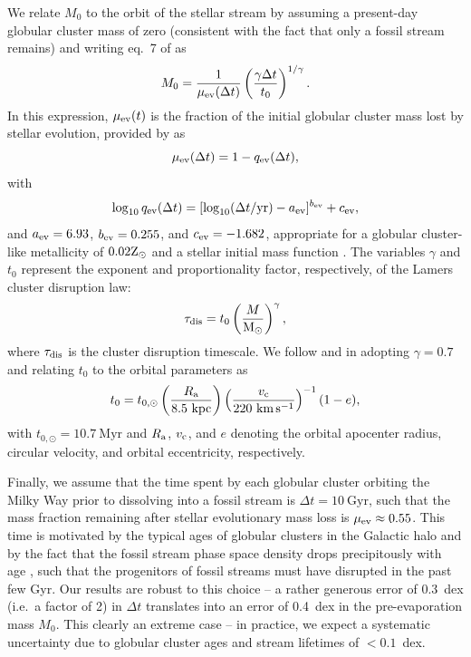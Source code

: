 \documentclass[twocolumn]{aastex63}
\newcommand{\msun}{\ensuremath{\textrm{M}_\odot}}
\newcommand{\myr}{\ensuremath{\textrm{Myr}}}
\newcommand{\gyr}{\ensuremath{\textrm{Gyr}}}
\newcommand{\kpc}{\ensuremath{\textrm{kpc}}}
\newcommand{\kms}{\ensuremath{\textrm{km}\,\textrm{s}^{-1}}}
\begin{document}
We relate $M_0$ to the orbit of the stellar stream by assuming a present-day globular cluster mass of zero (consistent with the fact that only a fossil stream remains) and writing eq.~7 of \citet{lamers05} as
\begin{equation}
\label{eq:m0}
M_{\rm 0}=\frac{1}{\mu_{\rm ev}(\Delta t)}\left(\frac{\gamma \Delta t}{t_0}\right)^{1/\gamma} .
\end{equation}
In this expression, $\mu_{\rm ev}(t)$ is the fraction of the initial globular cluster mass lost by stellar evolution, provided by \citet{lamers05} as
\begin{equation}
\label{eq:muev}
\mu_{\rm ev}(\Delta t)=1-q_{\rm ev}(\Delta t) ,
\end{equation}
with
\begin{equation}
\label{eq:qev}
\log_{10}{q_{\rm ev}}(\Delta t) = [\log_{10}(\Delta t/{\rm yr})-a_{\rm ev}]^{b_{\rm ev}}+c_{\rm ev} ,
\end{equation}
and $a_{\rm ev} = 6.93$, $b_{\rm ev} = 0.255$, and $c_{\rm ev} = -1.682$, appropriate for a globular cluster-like metallicity of $0.02{\rm Z}_\odot$ and a \citet{kroupa01} stellar initial mass function \citep{kruijssen08}. The variables $\gamma$ and $t_0$ represent the exponent and proportionality factor, respectively, of the Lamers cluster disruption law:
\begin{equation}
\label{eq:lamers}
\tau_{\rm dis}=t_0\left(\frac{M}{\msun}\right)^\gamma ,
\end{equation}
where $\tau_{\rm dis}$ is the cluster disruption timescale. We follow \citet{kruijssen09} and \citet{lamers:2010} in adopting $\gamma=0.7$ and relating $t_0$ to the orbital parameters as
\begin{equation}
\label{eq:t0}
t_0 = t_{0,\odot}\left(\frac{R_{\rm a}}{8.5~\kpc}\right)\left(\frac{v_{\rm c}}{220~\kms}\right)^{-1}(1-e) ,
\end{equation}
with $t_{0,\odot}=10.7~\myr$ and $R_{\rm a}$, $v_{\rm c}$, and $e$ denoting the orbital apocenter radius, circular velocity, and orbital eccentricity, respectively. 

Finally, we assume that the time spent by each globular cluster orbiting the Milky Way prior to dissolving into a fossil stream is $\Delta t=10~\gyr$, such that the mass fraction remaining after stellar evolutionary mass loss is $\mu_{\rm ev}\approx0.55$.
This time is motivated by the typical ages of globular clusters in the Galactic halo \citep[$\sim12~\gyr$, e.g.][]{kruijssen19e} and by the fact that the fossil stream phase space density drops precipitously with age \citep{helmi:1999}, such that the progenitors of fossil streams must have disrupted in the past few Gyr.
Our results are robust to this choice -- a rather generous error of 0.3~dex (i.e.\ a factor of 2) in $\Delta t$ translates into an error of 0.4~dex in the pre-evaporation mass $M_0$. This clearly an extreme case \citep[e.g.][]{marinfranch09,forbes10,dotter10,dotter11,vandenberg13,kruijssen19e} -- in practice, we expect a systematic uncertainty due to globular cluster ages and stream lifetimes of $<0.1$~dex.
\end{document}
